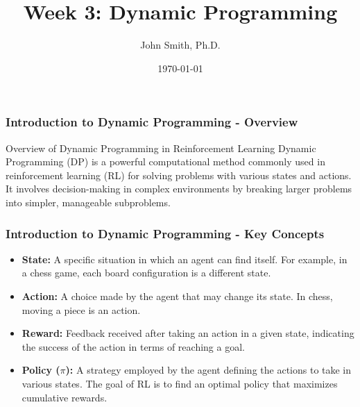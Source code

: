 \documentclass[aspectratio=169]{beamer}
\title[Dynamic Programming]{Week 3: Dynamic Programming}
\author[J. Smith]{John Smith, Ph.D.}
\institute[University Name]{
  Department of Computer Science\\
  University Name\\
  \vspace{0.3cm}
  Email: email@university.edu\\
  Website: www.university.edu
}
\date{\today}
\begin{document}
\frame{\titlepage}

\begin{frame}[fragile]
    \frametitle{Introduction to Dynamic Programming - Overview}
    \begin{block}{Overview of Dynamic Programming in Reinforcement Learning}
        Dynamic Programming (DP) is a powerful computational method commonly used in reinforcement learning (RL) for solving problems with various states and actions. It involves decision-making in complex environments by breaking larger problems into simpler, manageable subproblems.
    \end{block}
\end{frame}

\begin{frame}[fragile]
    \frametitle{Introduction to Dynamic Programming - Key Concepts}
    \begin{itemize}
        \item \textbf{State:} A specific situation in which an agent can find itself. For example, in a chess game, each board configuration is a different state.
        
        \item \textbf{Action:} A choice made by the agent that may change its state. In chess, moving a piece is an action.
        
        \item \textbf{Reward:} Feedback received after taking an action in a given state, indicating the success of the action in terms of reaching a goal.
        
        \item \textbf{Policy ($\pi$):} A strategy employed by the agent defining the actions to take in various states. The goal of RL is to find an optimal policy that maximizes cumulative rewards.
    \end{itemize}
\end{frame}
\end{document}

